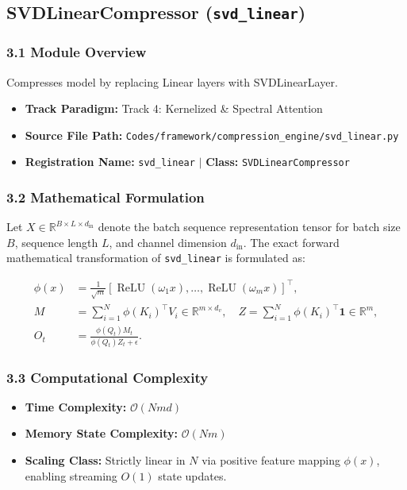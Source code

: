 \subsection{SVDLinearCompressor (\texttt{svd\_linear})}
\label{sec:app_module_svd_linear}

\subsubsection*{3.1 Module Overview}
Compresses model by replacing Linear layers with SVDLinearLayer.
\begin{itemize}
    \item \textbf{Track Paradigm:} Track 4: Kernelized & Spectral Attention
    \item \textbf{Source File Path:} \texttt{Codes/framework/compression\_engine/svd\_linear.py}
    \item \textbf{Registration Name:} \texttt{svd\_linear} $\mid$ \textbf{Class:} \texttt{SVDLinearCompressor}
\end{itemize}

\subsubsection*{3.2 Mathematical Formulation}
Let $X \in \mathbb{R}^{B \times L \times d_{\text{in}}}$ denote the batch sequence representation tensor for batch size $B$, sequence length $L$, and channel dimension $d_{\text{in}}$. The exact forward mathematical transformation of \texttt{svd\_linear} is formulated as:

\begin{align}
\phi(x) &= \frac{1}{\sqrt{m}} \left[ \operatorname{ReLU}(\omega_1 x), \dots, \operatorname{ReLU}(\omega_m x) \right]^\top, \\
M &= \sum_{i=1}^N \phi(K_i)^\top V_i \in \mathbb{R}^{m \times d_v}, \quad Z = \sum_{i=1}^N \phi(K_i)^\top \mathbf{1} \in \mathbb{R}^m, \\
O_t &= \frac{\phi(Q_t) M_t}{\phi(Q_t) Z_t + \epsilon}.
\end{align}


\subsubsection*{3.3 Computational Complexity}
\begin{itemize}
    \item \textbf{Time Complexity:} $\mathcal{O}(N m d)$
    \item \textbf{Memory State Complexity:} $\mathcal{O}(N m)$
    \item \textbf{Scaling Class:} Strictly linear in $N$ via positive feature mapping $\phi(x)$, enabling streaming $O(1)$ state updates.
\end{itemize}

